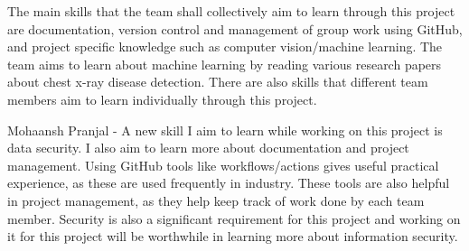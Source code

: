 \documentclass[12pt]{article}
\begin{document}
The main skills that the team shall collectively aim to learn through this project are documentation, version control and management of group work using GitHub, and project specific knowledge such as computer vision/machine learning. The team aims to learn about machine learning by reading various research papers about chest x-ray disease detection. There are also skills that different team members aim to learn individually through this project.

Mohaansh Pranjal - A new skill I aim to learn while working on this project is data security. I also aim to learn more about documentation and project management. Using GitHub tools like workflows/actions gives useful practical experience, as these are used frequently in industry. These tools are also helpful in project management, as they help keep track of work done by each team member. Security is also a significant requirement for this project and working on it for this project will be worthwhile in learning more about information security.
\end{document}
